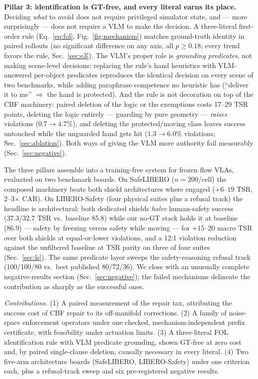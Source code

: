 \documentclass[conference]{IEEEtran}
\begin{document}
\textbf{Pillar 3: identification is GT-free, and every literal earns its place.} Deciding \emph{what} to avoid does not require privileged simulator state, and --- more surprisingly --- does not require a VLM to make the decision. A three-literal first-order rule (Eq.~\eqref{eq:fol}, Fig.~\ref{fig:mechanism}) matches ground-truth identity in paired rollouts (no significant difference on any axis, all $p\ge0.18$; every trend favors the rule, Sec.~\ref{sec:e3}). The VLM's proper role is \emph{grounding predicates}, not making scene-level decisions: replacing the rule's hand heuristics with VLM-answered per-object predicates reproduces the identical decision on every scene of two benchmarks, while adding paraphrase competence no heuristic has (``deliver it to me'' $\Rightarrow$ the hand is protected). And the rule is not decoration on top of the CBF machinery: paired deletion of the logic or the exemptions costs 17--29 TSR points, deleting the logic entirely --- guarding by pure geometry --- \emph{raises} violations ($0.7\to4.7\%$), and deleting the protected/moving class leaves success untouched while the unguarded hand gets hit ($1.3\to6.0\%$ violations; Sec.~\ref{sec:ablation}). Both ways of giving the VLM more authority fail measurably (Sec.~\ref{sec:negative}).

The three pillars assemble into a training-free system for frozen flow VLAs, evaluated on two benchmark boards. On SafeLIBERO ($n{=}200$/cell) the composed machinery beats both shield architectures where engaged ($+6$--$19$ TSR, 2--3$\times$ CAR). On LIBERO-Safety (four physical suites plus a refusal track) the headline is architectural: both dedicated shields \emph{halve} human-safety success (37.3/32.7 TSR vs.\ baseline 85.8) while our no-GT stack holds it at baseline (86.9) --- safety by freezing versus safety while moving --- for $+15$--$20$ macro TSR over both shields at equal-or-lower violations, and a 12:1 violation reduction against the unfiltered baseline at TSR parity on three of four suites (Sec.~\ref{sec:ls}). The same predicate layer sweeps the safety-reasoning refusal track (100/100/80 vs.\ best published 80/72/36). We close with an unusually complete negative-results section (Sec.~\ref{sec:negative}); the failed mechanisms delineate the contribution as sharply as the successful ones.

\emph{Contributions.} (1) A paired measurement of the repair tax, attributing the success cost of CBF repair to its off-manifold corrections. (2) A family of noise-space enforcement operators under one checked, mechanism-independent prefix certificate, with feasibility under actuation limits. (3) A three-literal FOL identification rule with VLM predicate grounding, shown GT-free at zero cost and, by paired single-clause deletion, causally necessary in every literal. (4) Two five-arm architecture boards (SafeLIBERO, LIBERO-Safety) under one criterion each, plus a refusal-track sweep and six pre-registered negative results.
\end{document}
